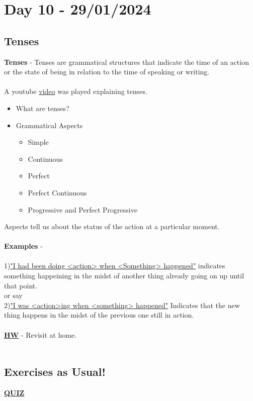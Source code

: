 \documentclass[a4paper,30pt]{report}
\begin{document}
  \chapter{Day 10 - 29/01/2024} %
  \label{chap:Day 10 - 29/01/2024}
    \section{Tenses} %
      \textbf{Tenses} - Tenses are grammatical structures that indicate the time of an action or the state of being in relation to the time of speaking or writing.\\\\
      A youtube \href{https://www.youtube.com/watch?v=54prMaPn5Ls&authuser=1}{video} was played explaining tenses. 
      \begin{itemize}
        \item What are tenses?
        \item Grammatical Aspects \begin{itemize}
            \item Simple
            \item Continuous
            \item Perfect
            \item Perfect Continuous
            \item Progressive and Perfect Progressive
          \end{itemize}
      \end{itemize}
      Aspects tell us about the status of the action at a particular moment.\\\\
      \textbf{Examples} -\\\\
      1)\underline{"I had been doing <action> when <Something> happened"} indicates something happeining in the midst of another thing already going on up until that point.\\
      or say\\
      2)\underline{"I was <action>ing when <something> happened"} Indicates that the new thing happens in the midst of the previous one still in action.\\\\
      \underline{\textbf{HW}} - Revisit at home.\\\\
    
    \section{Exercises as Usual!}
      \href{https://www.english-grammar.at/online_exercises/tenses/tenses_index.htm}{\textbf{QUIZ}}
  
  
\end{document}

